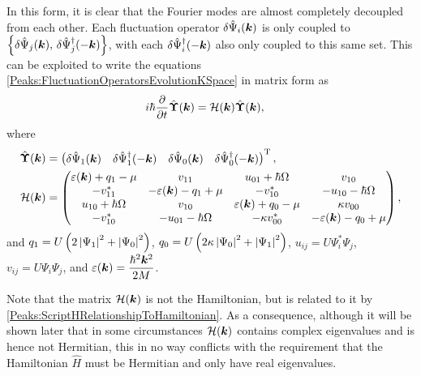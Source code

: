 In this form, it is clear that the Fourier modes are almost completely decoupled from each other. Each fluctuation operator $\delta\hat{\Psi}_i(\bm{k})$ is only coupled to $\left\{\delta\hat{\Psi}_j(\bm{k}),\, \delta\hat{\Psi}_j^\dagger(-\bm{k})\right\}$, with each $\delta\hat{\Psi}_i^\dagger(-\bm{k})$ also only coupled to this same set. This can be exploited to write the equations \eqref{Peaks:FluctuationOperatorsEvolutionKSpace} in matrix form as
\begin{align}
    \label{Peaks:FluctuationOperatorsMatrixEvolution}
    i \hbar \frac{\partial }{\partial t}\hat{\vect{\Upsilon}}(\vect{k}) &= \mathcal{H}(\vect{k}) \hat{\vect{\Upsilon}}(\vect{k}),
\end{align}
where
\begin{align}
    \hat{\vect{\Upsilon}}(\vect{k}) &= 
    \begin{pmatrix}
        \delta\hat{\Psi}_1(\vect{k}) &
        \delta\hat{\Psi}_1^\dagger(-\vect{k}) &
        \delta\hat{\Psi}_0(\vect{k}) &
        \delta\hat{\Psi}_0^\dagger(-\vect{k})
    \end{pmatrix}^\text{T},\\
    \mathcal{H}(\vect{k}) &= 
    \begin{pmatrix}
        \varepsilon(\vect{k}) + q_{1} - \mu & v_{11} & u_{01} + \hbar \Omega & v_{10}\\
        -v_{11}^* & -\varepsilon(\vect{k}) - q_1 + \mu & -v_{10}^* & -u_{10} - \hbar \Omega\\
        u_{10} + \hbar \Omega & v_{10} & \varepsilon(\vect{k}) + q_0 - \mu & \kappa v_{00}\\
        -v_{10}^* & -u_{01} - \hbar \Omega & -\kappa v_{00}^* & -\varepsilon(\vect{k}) - q_0 + \mu
    \end{pmatrix},\label{Peaks:HMatrix}
\end{align}
and $q_1 = U\left(2\left|\Psi_1\right|^2+\left|\Psi_0\right|^2\right)$, $q_0 = U\left(2\kappa \left|\Psi_0\right|^2 + \left|\Psi_1\right|^2\right)$, $u_{ij} = U\Psi_i^*\Psi_j$, $v_{ij} = U\Psi_i\Psi_j$, and $\displaystyle \protect{\varepsilon(\ensuremath{\bm{k}}) = \frac{\hbar^2 \ensuremath{\bm{k}}^2}{2M}}$.

Note that the matrix $\mathcal{H}(\bm{k})$ is not the Hamiltonian, but is related to it by \eqref{Peaks:ScriptHRelationshipToHamiltonian}. As a consequence, although it will be shown later that in some circumstances $\mathcal{H}(\bm{k})$ contains complex eigenvalues and is hence not Hermitian, this in no way conflicts with the requirement that the Hamiltonian $\hat{H}$ must be Hermitian and only have real eigenvalues.

